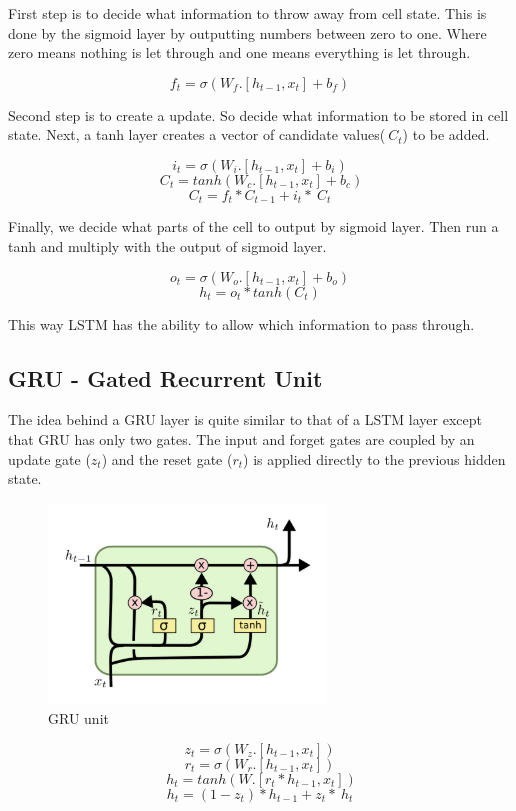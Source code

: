 \documentclass[runningheads]{llncs}
\begin{document}
First step is to decide what information to throw away from cell state. This is done by the sigmoid layer by outputting numbers between zero to one. Where zero means nothing is let through and one means everything is let through.

\[f_t = \sigma(W_f.[h_{t-1},x_t] + b_f) \]

Second step is to create a update. So decide what information to be stored in cell state. Next, a tanh layer creates a vector of candidate values($~C_t$) to be added.

\[i_t = \sigma(W_i.[h_{t-1},x_t] + b_i) \]
\[~C_t = tanh(W_c.[h_{t-1},x_t] + b_c) \]
\[C_t = f_t * C_{t-1} + i_t * ~C_t \]

Finally, we decide what parts of the cell to output by sigmoid layer. Then run a tanh and multiply with the output of sigmoid layer.

\[o_t = \sigma(W_o.[h_{t-1},x_t] + b_o) \]
\[ h_t = o_t * tanh(C_t)\]

This way LSTM has the ability to allow which information to pass through.
 
\subsection{GRU -  Gated Recurrent Unit}

The idea behind a GRU layer is quite similar to that of a LSTM layer except that GRU has only two gates. The input and forget gates are coupled by an update gate ($z_t$) and the reset gate ($r_t$) is applied directly to the previous hidden state.  

\begin{figure}[h!]
\centering
        \includegraphics[width=0.5\linewidth]{plots/working_gru}
    \caption{GRU unit}
\end{figure}

\[z_t = \sigma(W_z.[h_{t-1},x_t]) \]
\[r_t = \sigma(W_r.[h_{t-1},x_t]) \]
\[~h_t = tanh(W.[r_t * h_{t-1},x_t]) \]
\[h_t = (1-z_t) * h_{t-1} + z_t * ~h_t \]
\end{document}
